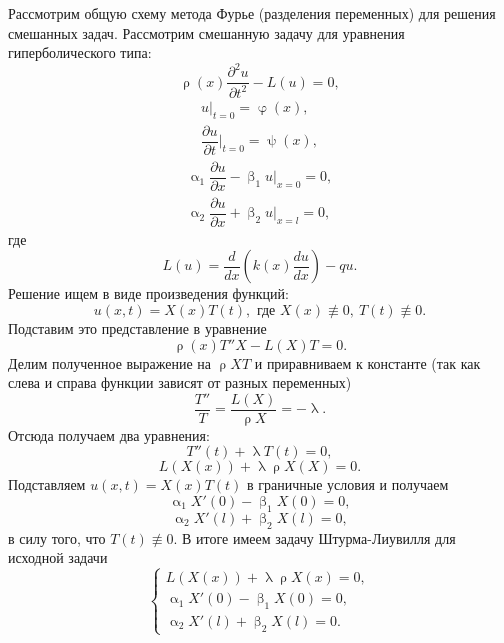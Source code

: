 \documentclass[a4paper, 12pt]{report}
\numberwithin{equation}{section}
\renewcommand{\alpha}{\upalpha}
\renewcommand{\beta}{\upbeta}
\renewcommand{\varphi}{\upvarphi}
\renewcommand{\lambda}{\uplambda}
\renewcommand{\psi}{\uppsi}
\renewcommand{\rho}{\uprho}
\newcommand{\pderiv}[2]{\dfrac{\partial #1}{\partial #2}}
\begin{document}
	Рассмотрим общую схему метода Фурье (разделения переменных) для решения смешанных задач.
	Рассмотрим смешанную задачу для уравнения гиперболического типа:
	\begin{equation}\label{3.5.1}
		\rho(x)\pderiv{^2u}{t^2}-L(u)=0,
	\end{equation}
	\begin{equation}\label{3.5.2}
		\begin{gathered}
			u|_{t=0}=\varphi(x),\\
			\pderiv{u}{t}\Bigr|_{t=0}=\psi(x),
		\end{gathered}
	\end{equation}
	\begin{equation}\label{3.5.3}
		\begin{gathered}
			\alpha_1\pderiv{u}{x}-\beta_1u\Bigr|_{x=0}=0,\\
			\alpha_2\pderiv{u}{x}+\beta_2u\Bigr|_{x=l}=0,
		\end{gathered}
	\end{equation}
	где
	$$L(u)=\frac{d}{dx}\left(k(x)\frac{du}{dx}\right)-qu.$$
	Решение ищем в виде произведения функций:
	$$u(x,t)=X(x)T(t), \text{ где }X(x)\not\equiv 0,\ T(t)\not\equiv 0.$$
	Подставим это представление в уравнение
	$$\rho(x)T''X-L(X)T=0.$$
	Делим полученное выражение на $\rho XT$ и приравниваем к константе (так как слева и справа функции зависят от разных переменных)
	$$\frac{T''}{T}=\frac{L(X)}{\rho X} = -\lambda.$$
	Отсюда получаем два уравнения:
	\begin{equation}\label{3.5.4}
		T''(t)+\lambda T(t)=0,
	\end{equation}
	\begin{equation}\label{3.5.5}
		L(X(x))+\lambda\rho X(X)=0.
	\end{equation}
	Подставляем $u(x,t) = X(x)T(t)$ в граничные условия и получаем
	\begin{equation}\label{3.5.6}
		\alpha_1X'(0)-\beta_1X(0)=0,
	\end{equation}
	\begin{equation}\label{3.5.7}
		\alpha_2X'(l)+\beta_2X(l)=0,
	\end{equation}
	в силу того, что $T(t) \not \equiv 0$.
	В итоге имеем задачу Штурма-Лиувилля для исходной задачи
	\begin{equation}
		\begin{cases}
			L(X(x))+\lambda\rho X(x)=0,\\
			\alpha_1X'(0)-\beta_1X(0)=0,\\
			\alpha_2X'(l)+\beta_2X(l)=0.
		\end{cases}
	\end{equation}
\end{document}
